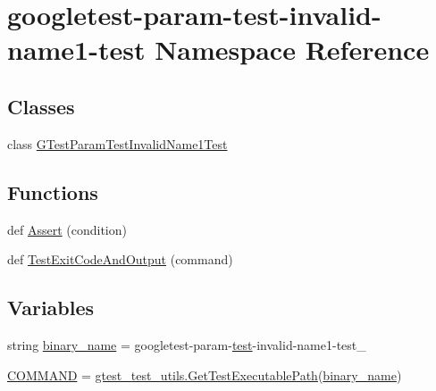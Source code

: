 \hypertarget{namespacegoogletest-param-test-invalid-name1-test}{}\section{googletest-\/param-\/test-\/invalid-\/name1-\/test Namespace Reference}
\label{namespacegoogletest-param-test-invalid-name1-test}
\subsection*{Classes}
\begin{DoxyCompactItemize}
\item 
class \mbox{\hyperlink{classgoogletest-param-test-invalid-name1-test_1_1_g_test_param_test_invalid_name1_test}{G\+Test\+Param\+Test\+Invalid\+Name1\+Test}}
\end{DoxyCompactItemize}
\subsection*{Functions}
\begin{DoxyCompactItemize}
\item 
def \mbox{\hyperlink{namespacegoogletest-param-test-invalid-name1-test_a2322bcd13b9e4fc90292b041a99fe368}{Assert}} (condition)
\item 
def \mbox{\hyperlink{namespacegoogletest-param-test-invalid-name1-test_aabb7407b7c6d63bd6b06899c5f5bc02e}{Test\+Exit\+Code\+And\+Output}} (command)
\end{DoxyCompactItemize}
\subsection*{Variables}
\begin{DoxyCompactItemize}
\item 
string \mbox{\hyperlink{namespacegoogletest-param-test-invalid-name1-test_a073018906c94da733e54cf4c457bec29}{binary\+\_\+name}} = \textquotesingle{}googletest-\/param-\/\mbox{\hyperlink{_mutual_8h_a707ee03719e99670bf6cfdfd897b8456}{test}}-\/invalid-\/name1-\/test\+\_\+\textquotesingle{}
\item 
\mbox{\hyperlink{namespacegoogletest-param-test-invalid-name1-test_a92131bc06f98ffc4aa4a6effd87da6fd}{C\+O\+M\+M\+A\+ND}} = \mbox{\hyperlink{namespacegtest__test__utils_a89ed3717984a80ffbb7a9c92f71b86a2}{gtest\+\_\+test\+\_\+utils.\+Get\+Test\+Executable\+Path}}(\mbox{\hyperlink{namespacegoogletest-param-test-invalid-name1-test_a073018906c94da733e54cf4c457bec29}{binary\+\_\+name}})
\end{DoxyCompactItemize}



